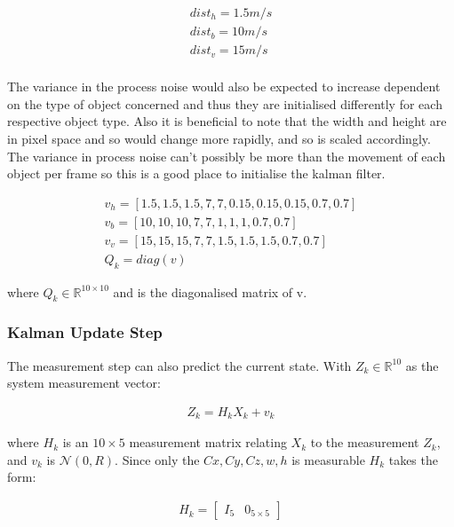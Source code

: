 \documentclass[11pt,twoside]{report}
\begin{document}
\begin{equation}
\begin{aligned}
dist_{h} = 1.5m/s \\
dist_{b} = 10 m/s \\
dist_{v} = 15 m/s \\
\end{aligned}
\end{equation}

The variance in the process noise would also be expected to increase dependent on the type of object concerned and thus they are initialised differently for each respective object type. Also it is beneficial to note that the width and height are in pixel space and so would change more rapidly, and so is scaled accordingly. The variance in process noise can't possibly be more than the movement of each object per frame so this is a good place to initialise the kalman filter.

\begin{equation}
\begin{aligned}
v_{h} = [1.5,1.5,1.5,7,7,0.15,0.15,0.15,0.7,0.7] \\
v_{b} = [10,10,10,7,7,1,1,1,0.7,0.7] \\
v_{v} = [15,15,15,7,7,1.5,1.5,1.5,0.7,0.7] \\
Q_{k} = diag(v)
\end{aligned}
\end{equation}

where $Q_{k} \in \mathbb{R}^{10 \times 10}$ and is the diagonalised matrix of v.

\subsubsection{Kalman Update Step}

The measurement step can also predict the current state. With $Z_{k} \in \mathbb{R}^{10}$ as the system measurement vector:

\begin{equation}
\begin{aligned}
Z_{k} =  H_{k} X_{k} + v_{k}
\end{aligned}
\end{equation}

where $H_{k}$ is an $10 \times 5$ measurement matrix relating $X_{k}$ to the measurement $Z_{k}$, and $v_{k}$ is $\mathcal{N}(0,R)$. Since only the $Cx,Cy,Cz,w,h$ is measurable $H_{k}$ takes the form:

\begin{equation}
\begin{aligned}
H_{k} = 
\begin{bmatrix}
I_{5} &  0_{5 \times 5}
\end{bmatrix}
\end{aligned}
\end{equation}
\end{document}
